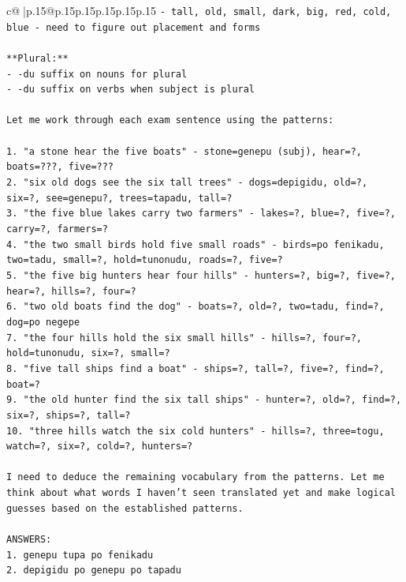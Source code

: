 \documentclass{article}
\begin{document}
{\begin{supertabular}{c@{$\;$}|p{.15\linewidth}@{}p{.15\linewidth}p{.15\linewidth}p{.15\linewidth}p{.15\linewidth}p{.15\linewidth}}
{{{\texttt{{-} tall, old, small, dark, big, red, cold, blue {-} need to figure out placement and forms} \\
\\ 
\texttt{**Plural:**} \\
\texttt{{-} {-}du suffix on nouns for plural} \\
\texttt{{-} {-}du suffix on verbs when subject is plural} \\
\\ 
\texttt{Let me work through each exam sentence using the patterns:} \\
\\ 
\texttt{1. "a stone hear the five boats" {-} stone=genepu (subj), hear=?, boats=???, five=???} \\
\texttt{2. "six old dogs see the six tall trees" {-} dogs=depigidu, old=?, six=?, see=genepu?, trees=tapadu, tall=?} \\
\texttt{3. "the five blue lakes carry two farmers" {-} lakes=?, blue=?, five=?, carry=?, farmers=?} \\
\texttt{4. "the two small birds hold five small roads" {-} birds=po fenikadu, two=tadu, small=?, hold=tunonudu, roads=?, five=?} \\
\texttt{5. "the five big hunters hear four hills" {-} hunters=?, big=?, five=?, hear=?, hills=?, four=?} \\
\texttt{6. "two old boats find the dog" {-} boats=?, old=?, two=tadu, find=?, dog=po negepe} \\
\texttt{7. "the four hills hold the six small hills" {-} hills=?, four=?, hold=tunonudu, six=?, small=?} \\
\texttt{8. "five tall ships find a boat" {-} ships=?, tall=?, five=?, find=?, boat=?} \\
\texttt{9. "the old hunter find the six tall ships" {-} hunter=?, old=?, find=?, six=?, ships=?, tall=?} \\
\texttt{10. "three hills watch the six cold hunters" {-} hills=?, three=togu, watch=?, six=?, cold=?, hunters=?} \\
\\ 
\texttt{I need to deduce the remaining vocabulary from the patterns. Let me think about what words I haven't seen translated yet and make logical guesses based on the established patterns.} \\
\\ 
\texttt{ANSWERS:} \\
\texttt{1. genepu tupa po fenikadu} \\
\texttt{2. depigidu po genepu po tapadu} \\
}}}
\end{supertabular}}
\end{document}

